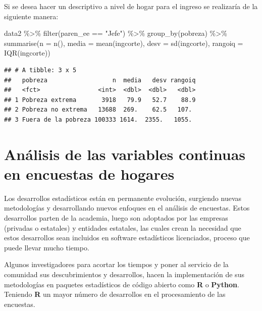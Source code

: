 \documentclass[
  12pt,
]{book}
\newenvironment{Shaded}{\begin{snugshade}}{\end{snugshade}}
\newcommand{\AttributeTok}[1]{\textcolor[rgb]{0.77,0.63,0.00}{#1}}
\newcommand{\FunctionTok}[1]{\textcolor[rgb]{0.00,0.00,0.00}{#1}}
\newcommand{\NormalTok}[1]{#1}
\newcommand{\SpecialCharTok}[1]{\textcolor[rgb]{0.00,0.00,0.00}{#1}}
\newcommand{\StringTok}[1]{\textcolor[rgb]{0.31,0.60,0.02}{#1}}
\begin{document}
Si se desea hacer un descriptivo a nivel de hogar para el ingreso se realizaría de la siguiente manera:

\begin{Shaded}
\begin{Highlighting}[]
\NormalTok{data2 }\SpecialCharTok{\%\textgreater{}\%} \FunctionTok{filter}\NormalTok{(paren\_ee }\SpecialCharTok{==} \StringTok{"Jefe"}\NormalTok{) }\SpecialCharTok{\%\textgreater{}\%} 
  \FunctionTok{group\_by}\NormalTok{(pobreza) }\SpecialCharTok{\%\textgreater{}\%}
  \FunctionTok{summarise}\NormalTok{(}\AttributeTok{n =} \FunctionTok{n}\NormalTok{(),}
            \AttributeTok{media =} \FunctionTok{mean}\NormalTok{(ingcorte),}
            \AttributeTok{desv =} \FunctionTok{sd}\NormalTok{(ingcorte),}
            \AttributeTok{rangoiq =} \FunctionTok{IQR}\NormalTok{(ingcorte))}
\end{Highlighting}
\end{Shaded}

\begin{verbatim}
## # A tibble: 3 x 5
##   pobreza                  n  media   desv rangoiq
##   <fct>                <int>  <dbl>  <dbl>   <dbl>
## 1 Pobreza extrema       3918   79.9   52.7    88.9
## 2 Pobreza no extrema   13688  269.    62.5   107. 
## 3 Fuera de la pobreza 100333 1614.  2355.   1055.
\end{verbatim}

\hypertarget{anuxe1lisis-de-las-variables-continuas-en-encuestas-de-hogares}{%
\chapter{Análisis de las variables continuas en encuestas de hogares}\label{anuxe1lisis-de-las-variables-continuas-en-encuestas-de-hogares}}

Los desarrollos estadísticos están en permanente evolución, surgiendo nuevas metodologías y desarrollando nuevos enfoques en el análisis de encuestas. Estos desarrollos parten de la academia, luego son adoptados por las empresas (privadas o estatales) y entidades estatales, las cuales crean la necesidad que estos desarrollos sean incluidos en software estadísticos licenciados, proceso que puede llevar mucho tiempo.

Algunos investigadores para acortar los tiempos y poner al servicio de la comunidad sus descubrimientos y desarrollos, hacen la implementación de sus metodologías en paquetes estadísticos de código abierto como \textbf{R} o \textbf{Python}. Teniendo \textbf{R} un mayor número de desarrollos en el procesamiento de las encuestas.
\end{document}
